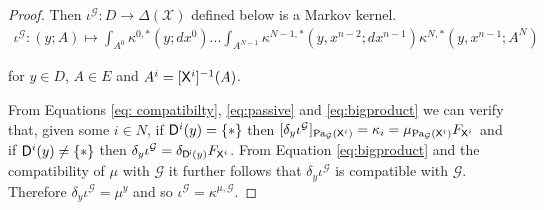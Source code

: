 \begin{proof}
Then $\iota^{\mathcal{G}}:D\to \Delta(\mathcal{X})$ defined below is a Markov kernel.
\begin{align}
    \iota^{\mathcal{G}}:(y;A)\mapsto \int_{A^0} \kappa^{0,*}(y;dx^0) ... \int_{A^{N-1}} \kappa^{N-1,*}(y,x^{n-2};dx^{n-1}) \kappa^{N,*}(y,x^{n-1};A^N) \label{eq:bigproduct}
\end{align}

for $y\in D$, $A\in E$ and $A^i= [\mathsf{X}^i]^{-1}(A)$.

From Equations \ref{eq: compatibilty}, \ref{eq:passive} and \ref{eq:bigproduct} we can verify that, given some $i\in N$, if $\mathsf{D}^i(y)=\{*\}$ then $[\delta_y \iota^{\mathcal{G}}]_{\text{Pa}_{\mathcal{G}}(\mathsf{X}^i)} = \kappa_i = \mu_{\text{Pa}_{\mathcal{G}}(\mathsf{X}^i)} F_{\mathsf{X}^i}$ and if $\mathsf{D}^i(y)\neq\{*\}$ then $\delta_y \iota^{\mathcal{G}} = \delta_{\mathsf{D^i}(y)} F_{\mathsf{X}^i}$. From Equation \ref{eq:bigproduct} and the compatibility of $\mu$ with $\mathcal{G}$ it further follows that $\delta_y\iota^\mathcal{G}$ is compatible with $\mathcal{G}$. Therefore $\delta_y \iota^\mathcal{G}=\mu^y$ and so $\iota^\mathcal{G}=\kappa^{\mu,\mathcal{G}}$.
\end{proof}